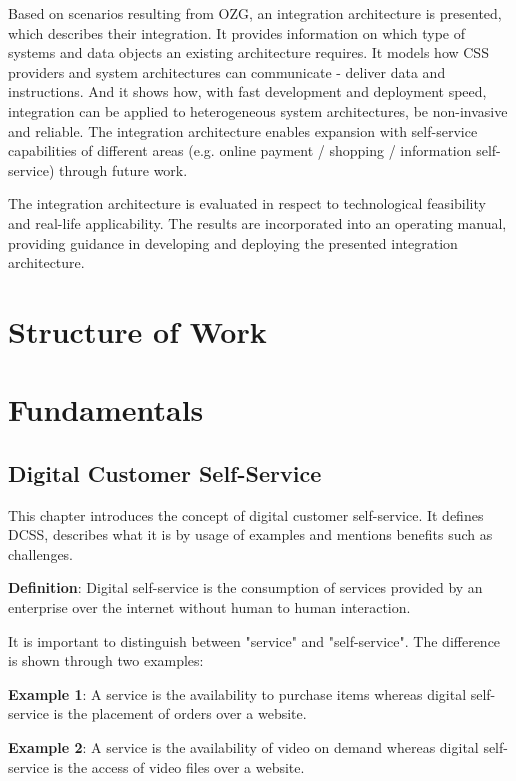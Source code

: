 \documentclass[
     12pt,         %
     a4paper,      %
     BCOR10mm,     %
     DIV14,        %
aragraph skip instad of paragraph indent
     ]{scrreprt}
\begin{document}
Based on scenarios resulting from OZG, an integration architecture is presented, which describes their integration. It provides information on which type of systems and data objects an existing architecture requires. It models how CSS providers and system architectures can communicate - deliver data and instructions. And it shows how, with fast development and deployment speed, integration can be applied to heterogeneous system architectures, be non-invasive and reliable. The integration architecture enables expansion with self-service capabilities of different areas (e.g. online payment / shopping / information self-service) through future work.

The integration architecture is evaluated in respect to technological feasibility and real-life applicability. The results are incorporated into an operating manual, providing guidance in developing and deploying the presented integration architecture.

\chapter{Structure of Work}


\chapter{Fundamentals}

\section{Digital Customer Self-Service}


This chapter introduces the concept of digital customer self-service. It defines DCSS, describes what it is by usage of examples and mentions benefits such as challenges.

\textbf{Definition}: Digital self-service is the consumption of services provided by an enterprise over the internet without human to human interaction.

It is important to distinguish between "service" and "self-service". The difference is shown through two examples:

\textbf{Example 1}: A service is the availability to purchase items whereas digital self-service is the placement of orders over a website.

\textbf{Example 2}: A service is the availability of video on demand whereas digital self-service is the access of video files over a website.
\end{document}
